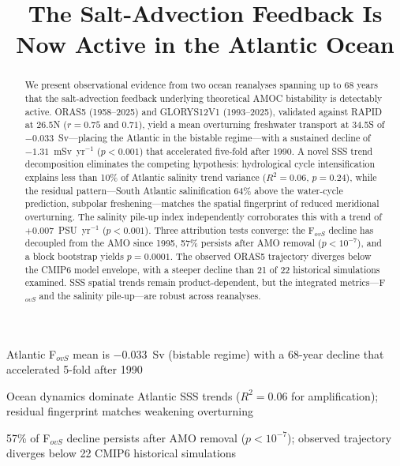 \documentclass{agujournal2019}
\begin{document}
\title{The Salt-Advection Feedback Is Now Active in the Atlantic Ocean}




\begin{keypoints}
\item Atlantic F$_{ovS}$ mean is $-0.033$~Sv (bistable regime) with a 68-year decline that accelerated 5-fold after 1990
\item Ocean dynamics dominate Atlantic SSS trends ($R^2 = 0.06$ for amplification); residual fingerprint matches weakening overturning
\item 57\% of F$_{ovS}$ decline persists after AMO removal ($p < 10^{-7}$); observed trajectory diverges below 22 CMIP6 historical simulations
\end{keypoints}

\begin{abstract}
We present observational evidence from two ocean reanalyses spanning up to 68 years that the salt-advection feedback underlying theoretical AMOC bistability is detectably active. ORAS5 (1958--2025) and GLORYS12V1 (1993--2025), validated against RAPID at 26.5\textdegree N ($r = 0.75$ and $0.71$), yield a mean overturning freshwater transport at 34.5\textdegree S of $-0.033$~Sv---placing the Atlantic in the bistable regime---with a sustained decline of $-1.31$~mSv~yr$^{-1}$ ($p < 0.001$) that accelerated five-fold after 1990. A novel SSS trend decomposition eliminates the competing hypothesis: hydrological cycle intensification explains less than 10\% of Atlantic salinity trend variance ($R^2 = 0.06$, $p = 0.24$), while the residual pattern---South Atlantic salinification 64\% above the water-cycle prediction, subpolar freshening---matches the spatial fingerprint of reduced meridional overturning. The salinity pile-up index independently corroborates this with a trend of $+0.007$~PSU~yr$^{-1}$ ($p < 0.001$). Three attribution tests converge: the F$_{ovS}$ decline has decoupled from the AMO since 1995, 57\% persists after AMO removal ($p < 10^{-7}$), and a block bootstrap yields $p = 0.0001$. The observed ORAS5 trajectory diverges below the CMIP6 model envelope, with a steeper decline than 21 of 22 historical simulations examined. SSS spatial trends remain product-dependent, but the integrated metrics---F$_{ovS}$ and the salinity pile-up---are robust across reanalyses.
\end{abstract}
\end{document}
